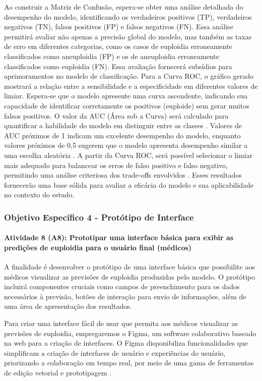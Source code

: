 Ao construir a Matriz de Confusão, espera-se obter uma análise detalhada do desempenho do modelo, identificando os verdadeiros positivos (TP), verdadeiros negativos (TN), falsos positivos (FP) e falsos negativos (FN). Essa análise permitirá avaliar não apenas a precisão global do modelo, mas também as taxas de erro em diferentes categorias, como os casos de euploidia erroneamente classificados como aneuploidia (FP) e os de aneuploidia erroneamente classificados como euploidia (FN). Essa avaliação fornecerá subsídios para aprimoramentos no modelo de classificação. Para a Curva ROC, o gráfico gerado mostrará a relação entre a sensibilidade e a especificidade em diferentes valores de limiar. Espera-se que o modelo apresente uma curva ascendente, indicando sua capacidade de identificar corretamente os positivos (euploide) sem gerar muitos falsos positivos. O valor da AUC (Área sob a Curva) será calculado para quantificar a habilidade do modelo em distinguir entre as classes \cite{vilela2022}. Valores de AUC próximos de 1 indicam um excelente desempenho do modelo, enquanto valores próximos de 0,5 sugerem que o modelo apresenta desempenho similar a uma escolha aleatória \cite{vilela2022}. A partir da Curva ROC, será possível selecionar o limiar mais adequado para balancear os erros de falso positivo e falso negativo, permitindo uma análise criteriosa dos trade-offs envolvidos \cite{vilela2022}. Esses resultados fornecerão uma base sólida para avaliar a eficácia do modelo e sua aplicabilidade no contexto do estudo.

\subsubsection{\textbf{Objetivo Específico 4} - Protótipo de Interface}

\paragraph{\textbf{Atividade 8 (A8):} Prototipar uma interface básica para exibir as predições de euploidia para o usuário final (médicos)}

A finalidade é desenvolver o protótipo de uma interface básica que possibilite aos médicos visualizar as previsões de euploidia produzidas pelo modelo. O protótipo incluirá componentes cruciais como campos de preenchimento para os dados necessários à previsão, botões de interação para envio de informações, além de uma área de apresentação dos resultados.

Para criar uma interface fácil de usar que permita aos médicos visualizar as previsões de euploidia, empregaremos o Figma, um software colaborativo baseado na web para a criação de interfaces. O Figma disponibiliza funcionalidades que simplificam a criação de interfaces de usuário e experiências do usuário, priorizando a colaboração em tempo real, por meio de uma gama de ferramentas de edição vetorial e prototipagem \cite{figma2024}.

